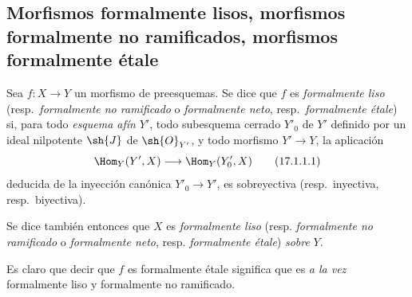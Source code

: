 \subsection{Morfismos formalmente lisos, morfismos formalmente no ramificados, morfismos formalmente étale}
\label{subsection:IV.17.1}

\begin{definition}[17.1.1]
\label{IV.17.1.1}
Sea $f:X\to Y$ un morfismo de preesquemas. Se dice que $f$ es \emph{formalmente liso} \textup{(resp.}\ \emph{formalmente no ramificado} o \emph{formalmente neto}, \textup{resp.}\ \emph{formalmente étale}\textup{)} si, para todo \emph{esquema afín} $Y'$, todo subesquema cerrado $Y'_0$ de $Y'$ definido por un ideal nilpotente $\sh{J}$ de $\sh{O}_{Y'}$, y todo morfismo $Y'\to Y$, la aplicación
\[
\label{IV.17.1.1.1}
  \Hom_Y(Y',X)\longrightarrow\Hom_Y(Y'_0,X)
  \tag{17.1.1.1}
\]
deducida de la inyección canónica $Y'_0\to Y'$, es sobreyectiva \textup{(resp.}\ inyectiva, \textup{resp.}\ biyectiva\textup{)}.
\end{definition}

Se dice también entonces que $X$ es \emph{formalmente liso} (resp. \emph{formalmente no ramificado} o \emph{formalmente neto}, resp. \emph{formalmente étale}) \emph{sobre} $Y$.

Es claro que decir que $f$ es formalmente étale significa que es \emph{a la vez} formalmente liso y formalmente no ramificado.

